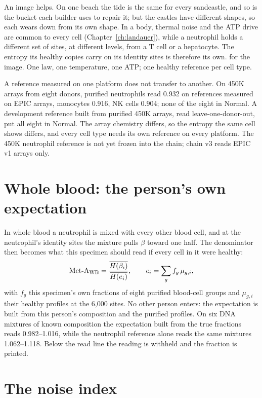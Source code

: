An image helps. On one beach the tide is the same for every sandcastle, and so is the bucket each builder uses to repair it; but the
castles have different shapes, so each wears down from its own shape. In a body, thermal noise and the ATP drive are common to
every cell (Chapter~\ref{ch:landauer}), while a neutrophil holds a different set of sites, at different levels, from a T cell or a
hepatocyte. The entropy its healthy copies carry on its identity sites is therefore its own. \analogy{} for the image. One law,
one temperature, one ATP; one healthy reference per cell type.

A reference measured on one platform does not transfer to another. On 450K arrays from eight donors, purified neutrophils
read 0.932 on references measured on EPIC arrays, monocytes 0.916, NK cells 0.904; none of the eight in Normal. A development
reference built from purified 450K arrays, read leave-one-donor-out, put all eight in Normal. \measured{} The
array chemistry differs, so the entropy the same cell shows differs, and every cell type needs its own reference on every
platform. The 450K neutrophil reference is not yet frozen into the chain; chain v3 reads EPIC v1 arrays only.

\section{Whole blood: the person's own expectation}

In whole blood a neutrophil is mixed with every other blood cell, and at the neutrophil's identity sites the mixture pulls
$\beta$ toward one half. The denominator then becomes what this specimen should read if every cell in it were healthy:
\begin{equation}
  \text{Met-A}_{\rm WB}=\frac{\overline{H(\beta_i)}}{\overline{H(e_i)}},\qquad e_i=\sum_g f_g\,\mu_{g,i},
  \label{eq:metawb}
\end{equation}
with $f_g$ this specimen's own fractions of eight purified blood-cell groups and $\mu_{g,i}$ their healthy profiles at the
6,000 sites. No other person enters: the expectation is built from this person's
composition and the purified profiles. On six DNA mixtures of known composition the expectation built from the true fractions
reads 0.982--1.016, while the neutrophil reference alone reads the same mixtures 1.062--1.118. \measured{}
Below the read line the reading is withheld and the fraction is printed.

\section{The noise index}

